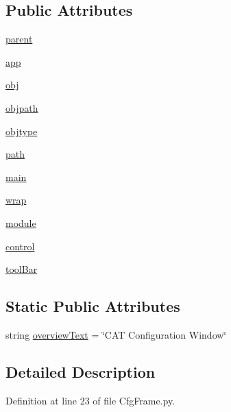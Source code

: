 \subsection*{Public Attributes}
\begin{DoxyCompactItemize}
\item 
\hyperlink{classCfgFrame_1_1CfgFrame_a7a50cede680918f3e56e10a6b7d542c5}{parent}
\item 
\hyperlink{classCfgFrame_1_1CfgFrame_a7bf641fd25de33d826971d3ccd86991e}{app}
\item 
\hyperlink{classCfgFrame_1_1CfgFrame_a7ba9545bedac3e6d22c315c1a0088a47}{obj}
\item 
\hyperlink{classCfgFrame_1_1CfgFrame_a143e7e34c8049d3475a10d7e84310300}{objpath}
\item 
\hyperlink{classCfgFrame_1_1CfgFrame_a572a9f7b982bae5e808036bc38ea9d5c}{objtype}
\item 
\hyperlink{classCfgFrame_1_1CfgFrame_a8394944c11a10f2cf95dc35dac95d53d}{path}
\item 
\hyperlink{classCfgFrame_1_1CfgFrame_a37a64faf7c30a69798c2c3e1d2c4f8f1}{main}
\item 
\hyperlink{classCfgFrame_1_1CfgFrame_af212f85b15458aa623810483fb62219d}{wrap}
\item 
\hyperlink{classCfgFrame_1_1CfgFrame_a4e23faffe7a71604bf2577789799ab47}{module}
\item 
\hyperlink{classCfgFrame_1_1CfgFrame_a49b8c4b1c1552fc22b1be69ea9d768c6}{control}
\item 
\hyperlink{classCfgFrame_1_1CfgFrame_a8714ef9a155def75a58efc0a4e7d9db1}{toolBar}
\end{DoxyCompactItemize}
\subsection*{Static Public Attributes}
\begin{DoxyCompactItemize}
\item 
string \hyperlink{classCfgFrame_1_1CfgFrame_a09acfb884e2c5f8581f5b0691413a2aa}{overviewText} = \char`\"{}CAT Configuration Window\char`\"{}
\end{DoxyCompactItemize}


\subsection{Detailed Description}


Definition at line 23 of file CfgFrame.py.

